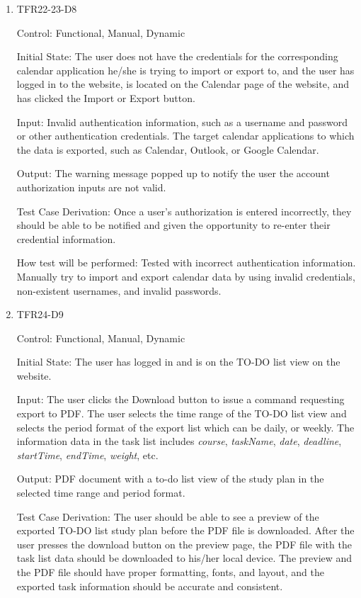 \documentclass[12pt, titlepage]{article}
\begin{document}
\begin{enumerate}
\item{TFR22-23-D8\\} \label{TFR22-23-D8}

Control: Functional, Manual, Dynamic
					
Initial State: The user does not have the credentials for the corresponding calendar application he/she is trying to import or export to, and the user has logged in to the website, is located on the Calendar page of the website, and has clicked the Import or Export button.
					
Input: Invalid authentication information, such as a username and password or other authentication credentials. The target calendar applications to which the data is exported, such as Calendar, Outlook, or Google Calendar.
					
Output: The warning message popped up to notify the user the account authorization inputs are not valid.

Test Case Derivation: Once a user's authorization is entered incorrectly, they should be able to be notified and given the opportunity to re-enter their credential information.
					
How test will be performed: Tested with incorrect authentication information. Manually try to import and export calendar data by using invalid credentials, non-existent usernames, and invalid passwords.

\item{TFR24-D9\\} \label{TFR24-D9}

Control: Functional, Manual, Dynamic
					
Initial State: The user has logged in and is on the TO-DO list view on the website.
					
Input: The user clicks the Download button to issue a command requesting export to PDF. The user selects the time range of the TO-DO list view and selects the period format of the export list which can be daily, or weekly. The information data in the task list includes \textit{course}, \textit{taskName}, \textit{date}, \textit{deadline}, \textit{startTime}, \textit{endTime}, \textit{weight}, etc.
					
Output: PDF document with a to-do list view of the study plan in the selected time range and period format.

Test Case Derivation: The user should be able to see a preview of the exported TO-DO list study plan before the PDF file is downloaded. After the user presses the download button on the preview page, the PDF file with the task list data should be downloaded to his/her local device. The preview and the PDF file should have proper formatting, fonts, and layout, and the exported task information should be accurate and consistent.
					

\end{enumerate}
\end{document}
